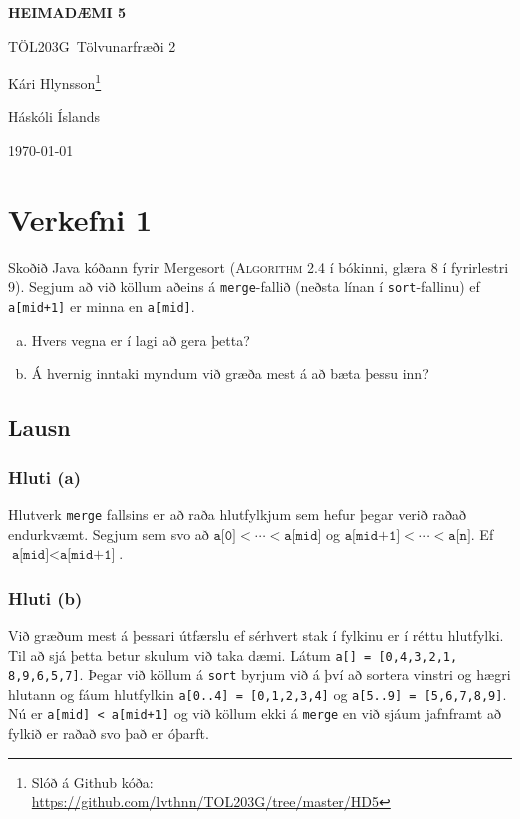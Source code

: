 \documentclass[12pt, a4paper, hidelinks]{article}
\title{}
\newcommand{\doctitle}{\uppercase{Heimadæmi 5}}
\newcommand{\coursename}{Tölvunarfræði 2}
\newcommand{\coursenum}{TÖL203G}
\begin{document}
\thispagestyle{plain}
\centerline{\bfseries\Large\doctitle}
\medskip
\centerline{\large\coursenum\ \coursename}
\bigskip

\centerline{\large Kári Hlynsson\footnote{Slóð á Github kóða: \url{https://github.com/lvthnn/TOL203G/tree/master/HD5}}}
\bigskip
\centerline{Háskóli Íslands}
\medskip
\centerline{\today}


\section*{Verkefni 1}
Skoðið Java kóðann fyrir Mergesort (\textsc{Algorithm 2.4} í bókinni, glæra 8 í fyrirlestri 9).
Segjum að við köllum aðeins á \texttt{merge}-fallið (neðsta línan í \texttt{sort}-fallinu) ef
\texttt{a[mid+1]} er minna en \texttt{a[mid]}.
\begin{enumerate}[(a)]
    \item Hvers vegna er í lagi að gera þetta?
    \item Á hvernig inntaki myndum við græða mest á að bæta þessu inn?
\end{enumerate}

\subsection*{Lausn}
\subsubsection*{Hluti (a)}
Hlutverk \texttt{merge} fallsins er að raða hlutfylkjum sem hefur þegar verið raðað endurkvæmt.
Segjum sem svo að $\texttt{a[0]} < \cdots < \texttt{a[mid]}$ og $\texttt{a[mid+1]} < \cdots < \texttt{a[n]}$.
Ef $\texttt{a[mid]} < \texttt{a[mid+1]}$.

\subsubsection*{Hluti (b)}
Við græðum mest á þessari útfærslu ef sérhvert stak í fylkinu er í réttu hlutfylki. Til að sjá þetta betur
skulum við taka dæmi. Látum \texttt{a[] = [0,4,3,2,1, 8,9,6,5,7]}. Þegar við köllum á \texttt{sort} byrjum
við á því að sortera vinstri og hægri hlutann og fáum hlutfylkin \texttt{a[0..4] = [0,1,2,3,4]} og \texttt{a[5..9] = [5,6,7,8,9]}.
Nú er \texttt{a[mid] < a[mid+1]} og við köllum ekki á \texttt{merge} en við sjáum jafnframt að fylkið er raðað svo það er óþarft.

\newpage
\end{document}
